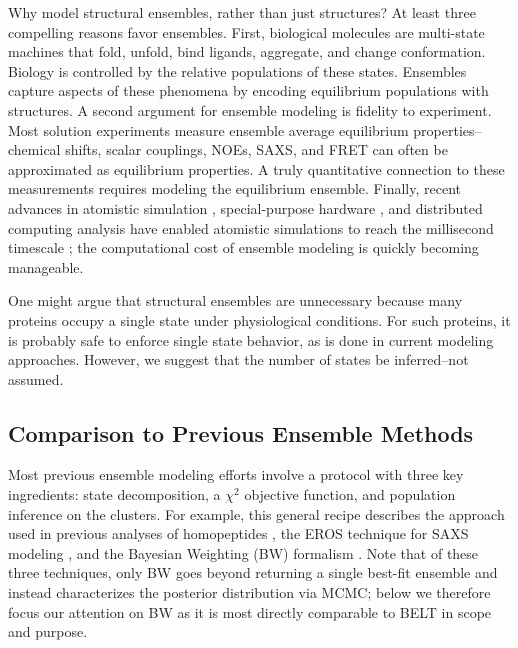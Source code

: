 \documentclass[11pt,titlepage]{article}
\begin{document}
Why model structural ensembles, rather than just structures?  At least three compelling reasons favor ensembles.  First, biological molecules are multi-state machines that fold, unfold, bind ligands, aggregate, and change conformation.  Biology is controlled by the relative populations of these states.  Ensembles capture aspects of these phenomena by encoding equilibrium populations with structures.  A second argument for ensemble modeling is fidelity to experiment.  Most solution experiments measure ensemble average equilibrium properties--chemical shifts, scalar couplings, NOEs, SAXS, and FRET can often be approximated as equilibrium properties.  A truly quantitative connection to these measurements requires modeling the equilibrium ensemble.  Finally, recent advances in atomistic simulation  \citep{hess2008, pronk2013gromacs, eastman2012openmm, eastman2010openmm}, special-purpose hardware  \citep{Shaw2008}, and distributed computing analysis  \citep{emma, msmb2} have enabled atomistic simulations to 
reach the millisecond timescale  \citep{voelz2010, bowman2011atomistic, shaw2010, Shaw2011}; the computational cost of ensemble modeling is quickly becoming manageable.

One might argue that structural ensembles are unnecessary because many proteins occupy a single state under physiological conditions.  For such proteins, it is probably safe to enforce single state behavior, as is done in current modeling approaches. However, we suggest that the number of states be inferred--not assumed.  

\subsection*{Comparison to Previous Ensemble Methods}

Most previous ensemble modeling efforts involve a protocol with three key ingredients: state decomposition, a $\chi^2$ objective function, and population inference on the clusters.  For example, this general recipe describes the approach used in previous analyses of homopeptides  \citep{Graf2007}, the EROS technique for SAXS modeling  \citep{rozycki2011saxs}, and the Bayesian Weighting (BW) formalism  \citep{fisher2010}.  Note that of these three techniques, only BW goes beyond returning a single best-fit ensemble and instead characterizes the posterior distribution via MCMC; below we therefore focus our attention on BW as it is most directly comparable to BELT in scope and purpose.
\end{document}
